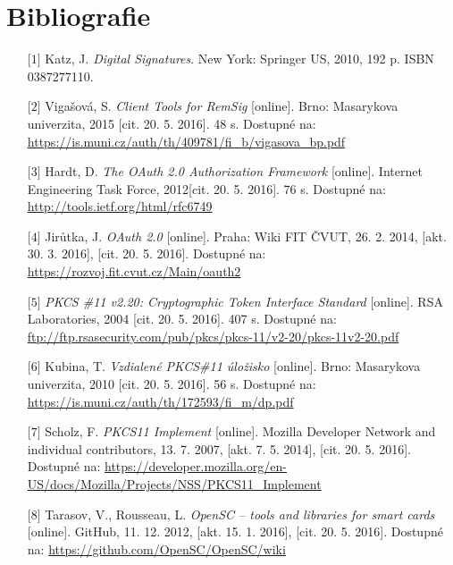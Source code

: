 \documentclass[]{fithesis3}
\begin{document}
\chapter{Bibliografie}
{\flushleft
\begin{itemize}
	
	\item[$\mbox{[1]}$] Katz, J. \textit{Digital Signatures}. New York: Springer US, 2010, 192 p. ISBN 0387277110.

	\item[$\mbox{[2]}$] Vigašová, S. \textit{Client Tools for RemSig} [online]. Brno: Masarykova univerzita, 2015 [cit. 20. 5. 2016]. 48 s. Dostupné na: \url{https://is.muni.cz/auth/th/409781/fi_b/vigasova_bp.pdf}

	\item[$\mbox{[3]}$] Hardt, D. \textit{The OAuth 2.0 Authorization Framework} [online]. Internet Engineering Task Force, 2012[cit. 20. 5. 2016]. 76 s. Dostupné na: \url{http://tools.ietf.org/html/rfc6749}

	\item[$\mbox{[4]}$] Jirůtka, J. \textit{OAuth 2.0} [online]. Praha: Wiki FIT ČVUT, 26. 2. 2014, [akt. 30. 3. 2016], [cit. 20. 5. 2016].  Dostupné na: \url{https://rozvoj.fit.cvut.cz/Main/oauth2}

	\item[$\mbox{[5]}$] \textit{PKCS \#11 v2.20: Cryptographic Token Interface Standard} [online]. RSA Laboratories, 2004 [cit. 20. 5. 2016]. 407 s. Dostupné na: \url{ftp://ftp.rsasecurity.com/pub/pkcs/pkcs-11/v2-20/pkcs-11v2-20.pdf}

	\item[$\mbox{[6]}$] Kubina, T. \textit{Vzdialené PKCS\#11 úložisko} [online]. Brno: Masarykova univerzita, 2010 [cit. 20. 5. 2016]. 56 s. Dostupné na: \url{https://is.muni.cz/auth/th/172593/fi_m/dp.pdf}

	\item[$\mbox{[7]}$] Scholz, F. \textit{PKCS11 Implement} [online]. Mozilla Developer Network and individual contributors, 13. 7. 2007, [akt. 7. 5. 2014], [cit. 20. 5. 2016]. Dostupné na: \url{https://developer.mozilla.org/en-US/docs/Mozilla/Projects/NSS/PKCS11_Implement}

	\item[$\mbox{[8]}$]Tarasov, V., Rousseau, L. \textit{OpenSC – tools and libraries for smart cards} [online]. GitHub, 11. 12. 2012, [akt. 15. 1. 2016], [cit. 20. 5. 2016]. Dostupné na: \url{https://github.com/OpenSC/OpenSC/wiki}


\end{itemize}}
\end{document}
